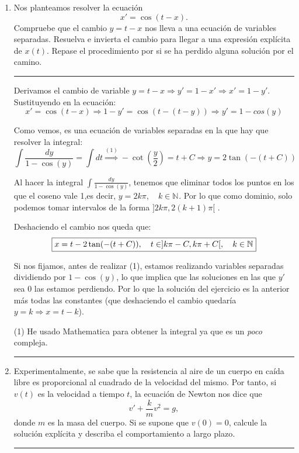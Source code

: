\documentclass[12pt]{article}
\newcommand{\R}[1][]{\mathbb{R}^{#1}}
\newcommand{\N}[1][]{\mathbb{N}^{#1}}
\newcommand{\solution}[1]{\text{\fbox{$#1$}}}
\begin{document}
\begin{enumerate}
Para la segunda ecuación también aplicamos variables separadas, por lo que tendríamos que resolver la integral:
\[
\int\frac{dP}{P(\alpha-\beta \ln P)}=\int dt
\]
La primera integral se resuelve con el cambio de variable $u=\alpha - \beta \ln P \quad dx=-\frac{x}{\beta}du$, que nos da:
\[
\int\frac{dP}{P(\alpha-\beta \ln P)}=\int dt \Longrightarrow -\frac{\ln(|\beta\ln(P)-\alpha|)}{b}=t+C
\]

De donde no vamos a despejar $P$ por simplicidad, luego la solución, en implícitas, es:
\[
\solution{-\frac{\ln(|\beta\ln(P)-\alpha|)}{b}=t+C \quad C\in\R}
\]

\hrule
\item Nos planteamos resolver la ecuación
\[
x'=\cos(t-x).
\]
Compruebe que el cambio $y=t-x$ nos lleva a una ecuación de variables separadas. Resuelva e invierta el cambio para llegar a una expresión explícita de $x(t)$. Repase el procedimiento por si se ha perdido alguna solución por el camino.\\
\hrule

Derivamos el cambio de variable $y=t-x \Longrightarrow y'=1-x' \Longrightarrow x'=1-y'$. Sustituyendo en la ecuación:
\[
x'=\cos(t-x) \Longrightarrow 1-y'=\cos(t-(t-y)) \Longrightarrow y'=1-cos(y)
\]

Como vemos, es una ecuación de variables separadas en la que hay que resolver la integral:
\[
\int \frac{dy}{1-\cos(y)}=\int dt \stackrel{(1)}{\Longrightarrow} -\cot(\frac{y}{2}) = t+C \Longrightarrow y=2\tan(-(t+C))
\]

Al hacer la integral $\displaystyle \int \frac{dy}{1-\cos(y)} $, tenemos que eliminar todos los puntos en los que el coseno vale 1,es decir, $y=2k\pi, \quad k\in\N$. Por lo que como dominio, solo podemos tomar intervalos de la forma $]2k\pi,2(k+1)\pi[$ .


Deshaciendo el cambio nos queda que:
\[
\solution{x=t-2\tan(-(t+C)), \quad t\in ]k\pi-C, k\pi+C[, \quad k\in\N}
\]

Si nos fijamos, antes de realizar (1), estamos realizando variables separadas dividiendo por $1-\cos(y)$, lo que implica que las soluciones en las que $y'$ sea 0 las estamos perdiendo. Por lo que la solución del ejercicio es la anterior más todas las constantes (que deshaciendo el cambio quedaría $y=k \Longrightarrow x=t-k$). 

(1) He usado Mathematica para obtener la integral ya que es un \textit{poco} compleja.

\hrule
\item Experimentalmente, se sabe que la resistencia al aire de un cuerpo en caída libre es proporcional al cuadrado de la velocidad del mismo. Por tanto, si $v(t)$ es la velocidad a tiempo $t$, la ecuación de Newton nos dice que
\[
v'+\frac{k}{m}v^2=g,
\]
donde $m$ es la masa del cuerpo. Si se supone que $v(0)=0$, calcule la solución explícita y describa el comportamiento a largo plazo.
\hrule


\end{enumerate}
\end{document}
